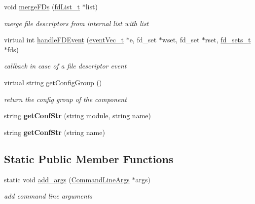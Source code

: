 \begin{DoxyCompactItemize}
\mbox{\label{classQualityManagerComponent_a90a96e6b35798eb8954cd8ee59ce2dad}} 
void \hyperlink{classQualityManagerComponent_a90a96e6b35798eb8954cd8ee59ce2dad}{merge\+F\+Ds} (\hyperlink{QualityManagerComponent_8h_af42271cb30f9491a19b978393507b162}{fd\+List\+\_\+t} $\ast$list)
\begin{DoxyCompactList}\small\item\em merge file descriptors from internal list with list \end{DoxyCompactList}\item 
\mbox{\label{classQualityManagerComponent_aa5c2bbe7ca83fda048e6515e68714364}} 
virtual int \hyperlink{classQualityManagerComponent_aa5c2bbe7ca83fda048e6515e68714364}{handle\+F\+D\+Event} (\hyperlink{QualityManagerComponent_8h_acd67c59a21d5c694ab882c8905db0a2a}{event\+Vec\+\_\+t} $\ast$e, fd\+\_\+set $\ast$wset, fd\+\_\+set $\ast$rset, \hyperlink{structfd__sets__t}{fd\+\_\+sets\+\_\+t} $\ast$fds)
\begin{DoxyCompactList}\small\item\em callback in case of a file descriptor event \end{DoxyCompactList}\item 
\mbox{\label{classQualityManagerComponent_ab5ce70b7ed86f3a2c5909a983056a8f4}} 
virtual string \hyperlink{classQualityManagerComponent_ab5ce70b7ed86f3a2c5909a983056a8f4}{get\+Config\+Group} ()
\begin{DoxyCompactList}\small\item\em return the config group of the component \end{DoxyCompactList}\item 
\mbox{\label{classQualityManagerComponent_a27606881be415eb3f172530ddfd34cb6}} 
string {\bfseries get\+Conf\+Str} (string module, string name)
\item 
\mbox{\label{classQualityManagerComponent_a6479180677cb709afe8a10a1d1b97eec}} 
string {\bfseries get\+Conf\+Str} (string name)
\end{DoxyCompactItemize}
\subsection*{Static Public Member Functions}
\begin{DoxyCompactItemize}
\item 
\mbox{\label{classQualityManagerComponent_a204edcf51cefc6248eb12b02addd2f38}} 
static void \hyperlink{classQualityManagerComponent_a204edcf51cefc6248eb12b02addd2f38}{add\+\_\+args} (\hyperlink{classCommandLineArgs}{Command\+Line\+Args} $\ast$args)
\begin{DoxyCompactList}\small\item\em add command line arguments \end{DoxyCompactList}\end{DoxyCompactItemize}
